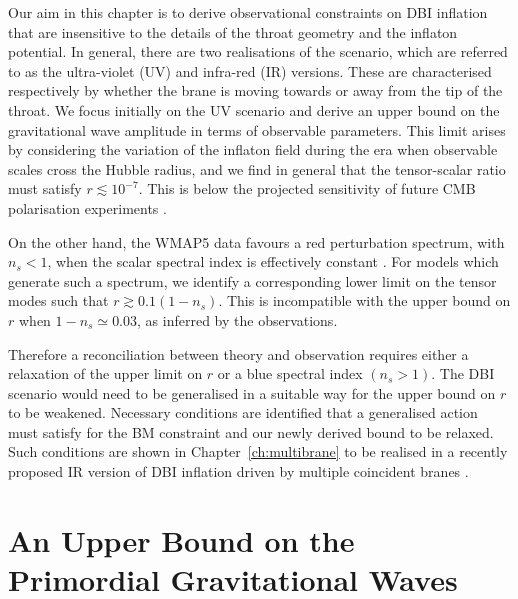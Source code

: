 Our aim in this chapter is to derive observational constraints on DBI inflation
that are 
insensitive to the details of the throat geometry and the inflaton potential. 
In general, there are two realisations of the scenario, 
which are referred to as the ultra-violet (UV) and infra-red (IR) 
versions. These are characterised respectively by whether the brane is 
moving towards or away from the tip of the throat. 
We focus initially on the UV scenario 
and derive an upper bound on 
the gravitational wave amplitude in terms of observable 
parameters. This limit arises by considering 
the variation of the inflaton field during the era when 
observable scales cross the Hubble radius, and 
we find in general that the tensor-scalar ratio must satisfy 
$r \lesssim 10^{-7}$. This 
is below the projected sensitivity of future CMB
polarisation 
experiments \cite{Baumann:2008aq,vpj}. 

On the other hand, the WMAP5 data 
favours a red perturbation spectrum, with 
$n_s<1$, when  
the scalar spectral index is effectively constant \cite{Komatsu:2008hk}. 
For models which generate such a spectrum, 
we identify a corresponding lower limit on the 
tensor modes such that $r \gtrsim 0.1 (1-n_s)$. 
This is incompatible with the upper bound 
on $r$ when $1-n_s \simeq 0.03$, as inferred
by the observations. 

Therefore a reconciliation between theory and observation 
requires either a relaxation of the upper limit on $r$ or a blue 
spectral index $(n_s >1)$. The DBI scenario would need 
to be generalised in a suitable way for the upper bound on $r$
to be weakened. Necessary conditions are identified that a 
generalised action must satisfy for the BM constraint and our newly derived
bound to be relaxed. 
Such conditions are shown in Chapter~\ref{ch:multibrane} to be
realised in a recently proposed IR version of DBI inflation driven
by multiple coincident branes \cite{thomasward}. 

% 
% 
\section{An Upper Bound on the Primordial Gravitational Waves}
% 
\label{sec:upper-dbi}
%

